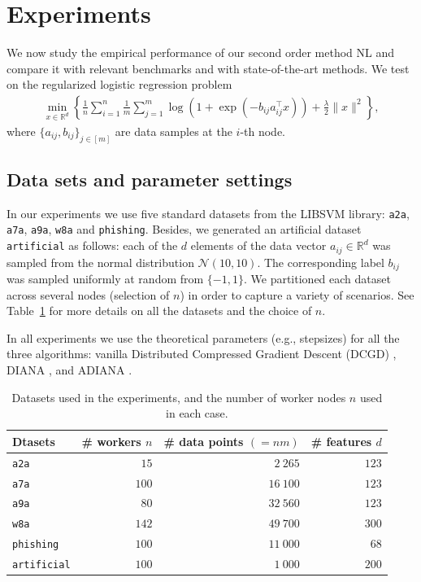 \documentclass[12pt]{article}
\newcommand{\squeeze}{}
\newcommand{\R}{\mathbb{R}}
\begin{document}
\section{Experiments}
\label{sec:experiments}



We now study the empirical performance of our second order method {\sf NL} and compare it with relevant benchmarks and with state-of-the-art methods. We  test on  the regularized logistic regression problem
\begin{eqnarray*}\squeeze
	\min\limits_{x\in\R^d}\left\{\frac{1}{n}\sum\limits_{i=1}^n\frac{1}{m}\sum\limits_{j=1}^m\log\left(1+\exp(-b_{ij}a_{ij}^\top x)\right) + \frac{\lambda}{2}\|x\|^2\right\},
\end{eqnarray*}
where $\{a_{ij}, b_{ij}\}_{j\in[m]}$ are data samples at the $i$-th node. 







\subsection{Data sets and parameter settings} 

In our experiments we use five standard datasets from the LIBSVM library:  {\tt a2a}, {\tt a7a}, {\tt a9a},  {\tt w8a} and {\tt phishing}. Besides, we generated an artificial dataset {\tt artificial} as follows: each of the $d$ elements of the data vector $a_{ij}\in \R^d$ was sampled from the normal distribution $\mathcal{N} (10, 10).$ The corresponding label $b_{ij}$ was sampled uniformly at random from $\{-1, 1\}$. We partitioned each dataset across several nodes (selection of $n$)  in order to capture a variety of scenarios. See Table~\ref{table1} for more details on all the datasets and the choice of $n$. 

In all experiments we use the theoretical parameters (e.g., stepsizes) for all the three algorithms: vanilla Distributed Compressed Gradient Descent (DCGD) \citep{KFJ}, DIANA \citep{DIANA}, and ADIANA \citep{ADIANA}. 


\begin{table}[h]
	\caption{Datasets used in the experiments, and the number of worker nodes $n$ used in each case.}
	\label{table1}
	\begin{center}
		\begin{tabular}{|l|r|r|r|}
			\hline
			 {\bf Dtasets} & {\bf \# workers} $n$ &{\bf \# data points} $(=nm)$ & \bf\# features $d$ \\ \hline
			{\tt a2a} & $15$ & $2~265$ & $123$\\ \hline
			{\tt a7a} & $100$ & $16~100$ & $123$\\ \hline
			{\tt a9a} & $80$ & $32~560$ & $123$\\ \hline
			{\tt w8a} & $142$ & $49~700$ & $300$\\ \hline
			{\tt phishing} & $100$ & $11~000$ & $68$\\ \hline
			{\tt artificial} & $100$ & $1~000$ & $200$\\
			\hline
		\end{tabular}
	\end{center}
\end{table}
\end{document}
